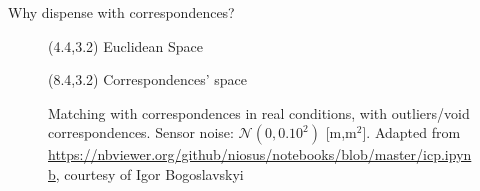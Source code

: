 \begin{frame}[noframenumbering]{Why dispense with correspondences?}

  \begin{figure}\vspace{1cm}
    \caption{Matching with correspondences in real conditions, with
             outliers/void correspondences. Sensor noise:
             $\mathcal{N}(0, 0.10^2)$ [m,m$^2$]. Adapted from
             \url{https://nbviewer.org/github/niosus/notebooks/blob/master/icp.ipynb},
              courtesy of Igor Bogoslavskyi}
    \begin{textblock}{3}(4.4,3.2)
      \scriptsize Euclidean Space
    \end{textblock}
    \begin{textblock}{4}(8.4,3.2)
      \scriptsize Correspondences' space
    \end{textblock}
  \end{figure}

\end{frame}
